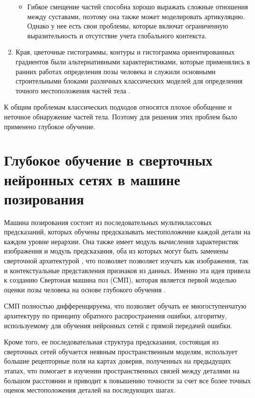 \begin{enumerate}[label=\arabic*)]
\begin{itemize}
 			\item Гибкое смещение частей способна хорошо выражать сложные отношения между суставами, поэтому она также может моделировать артикуляцию.
 			Однако у нее есть свои проблемы, которые включат ограниченную выразительность и отсутствие учета глобального контекста.
 			
 				
 		\end{itemize}
 		
 		
 	\item Края, цветочные гистограммы, контуры и гистограмма ориентированных градиентов были альтернативными характеристиками, которые применялись в ранних работах определения позы человека и служили основными строительными блоками различных классических моделей для определения точного местоположения частей тела \cite{polygraphic}. 
\end{enumerate}

К общим проблемам классических подходов относятся плохое обобщение и неточное обнаружение частей тела. Поэтому для решения этих проблем было применено глубокое обучение.

\section{Глубокое обучение в сверточных нейронных сетях в машине позирования}

Машина позирования состоит из последовательных мультиклассовых предсказаний, которых обучены предсказывать местоположение каждой детали на каждом уровне иерархии. Она также имеет модуль вычисления характеристик изображения и модуль предсказания, оба из которых могут быть заменены сверточной архитектурой \cite{CNN}, что позволяет позволяет изучать как изображения, так и контекстуальные представления признаков из данных.
Именно эта идея привела к созданию Свертоная машина поз (СМП), которая является первой моделью оценки позы человека на основе глубокого обучения \cite{wei2016cpm}.

СМП полностью дифференцируема, что позволяет обучать ее многоступенчатую архитектуру по принципу обратного распространения ошибки, алгоритму, используемому для обучения нейронных сетей с прямой передачей ошибки.

Кроме того, ее последовательная структура предсказания, состоящая из сверточных сетей обучается неявным пространственным моделям, использует большие рецепторные поля на картах доверия, полученных на предыдущих этапах, что помогает в изучении пространственных связей между деталями на большом расстоянии и приводит к повышению точности за счет все более точных оценок местоположения деталей на последующих шагах.

